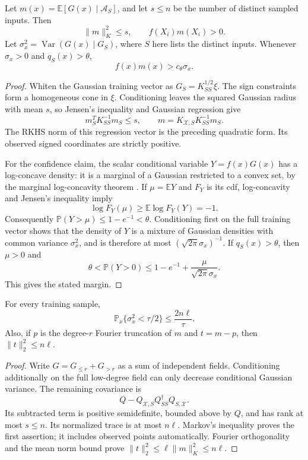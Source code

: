 \begin{lemma}\label{lem:schedule-mean}
Let $m(x)=\mathbb E[G(x)\mid\mathcal A_S]$, and let $s\le n$ be the
number of distinct sampled inputs. Then
\[
 \|m\|_K^2\le s,\qquad f(X_i)m(X_i)>0.
\]
Let $\sigma_x^2=\operatorname{Var}(G(x)\mid G_S)$, where $S$ here lists
the distinct inputs. Whenever $\sigma_x>0$ and $q_S(x)>\theta$,
\[
 f(x)m(x)>c_\theta\sigma_x.
\]
\end{lemma}
\begin{proof}
Whiten the Gaussian training vector as $G_S=K_{SS}^{1/2}\xi$.
The sign constraints form a homogeneous cone in $\xi$. Conditioning
leaves the squared Gaussian radius with mean $s$, so Jensen's inequality
and Gaussian regression give
\[
 m_S^TK_{SS}^{-1}m_S\le s,\qquad
 m=K_{\mathcal X,S}K_{SS}^{-1}m_S.
\]
The RKHS norm of this regression vector is the preceding quadratic
form. Its observed signed coordinates are strictly positive.

For the confidence claim, the scalar conditional variable
$Y=f(x)G(x)$ has a log-concave density: it is a marginal of a Gaussian
restricted to a convex set, by the marginal log-concavity theorem \cite{prekopa1973}. If $\mu=\mathbb E Y$ and $F_Y$ is its
cdf, log-concavity and Jensen's inequality imply
\[
 \log F_Y(\mu)\ge\mathbb E\log F_Y(Y)=-1.
\]
Consequently $\mathbb P(Y>\mu)\le1-e^{-1}<\theta$.
Conditioning first on the full training vector shows that the density
of $Y$ is a mixture of Gaussian densities with common variance
$\sigma_x^2$, and is therefore at most
$(\sqrt{2\pi}\sigma_x)^{-1}$. If $q_S(x)>\theta$, then $\mu>0$ and
\[
 \theta<\mathbb P(Y>0)
 \le 1-e^{-1}+\frac{\mu}{\sqrt{2\pi}\sigma_x}.
\]
This gives the stated margin.
\end{proof}

\begin{lemma}\label{lem:schedule-var}
For every training sample,
\[
 \mathbb P_x\{\sigma_x^2<\tau/2\}\le \frac{2n\ell}{\tau}.
\]
Also, if $p$ is the degree-$r$ Fourier truncation of $m$ and $t=m-p$,
then $\|t\|_2^2\le n\ell$.
\end{lemma}
\begin{proof}
Write $G=G_{\le r}+G_{>r}$ as a sum of independent fields. Conditioning
additionally on the full low-degree field can only decrease conditional
Gaussian variance. The remaining covariance is
\[
 Q-Q_{\mathcal X,S}Q_{SS}^{\dagger}Q_{S,\mathcal X}.
\]
Its subtracted term is positive semidefinite, bounded above by $Q$,
and has rank at most $s\le n$. Its normalized trace is at most $n\ell$.
Markov's inequality proves the first assertion; it includes observed
points automatically. Fourier orthogonality and the mean norm bound
prove $\|t\|_2^2\le\ell\|m\|_K^2\le n\ell$.
\end{proof}

